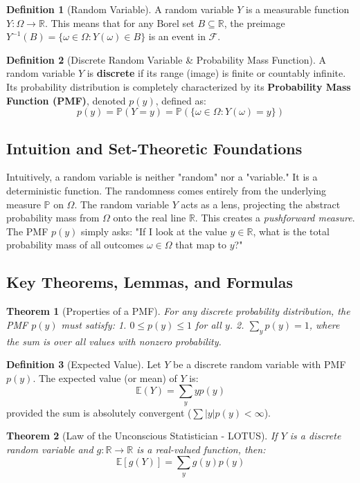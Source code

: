 \documentclass[11pt,letterpaper]{article}
\theoremstyle{definition}
\newtheorem{definition}{Definition}[section]
\theoremstyle{plain}
\newtheorem{theorem}{Theorem}[section]
\theoremstyle{remark}
\newcommand{\E}{\mathbb{E}}
\newcommand{\R}{\mathbb{R}}
\newcommand{\Prob}{\mathbb{P}}
\newcommand{\F}{\mathcal{F}}
\begin{document}
\begin{definition}[Random Variable]
A random variable $Y$ is a measurable function $Y: \Omega \to \R$. This means that for any Borel set $B \subseteq \R$, the preimage $Y^{-1}(B) = \{\omega \in \Omega : Y(\omega) \in B\}$ is an event in $\F$. 
\end{definition}

\begin{definition}[Discrete Random Variable \& Probability Mass Function]
A random variable $Y$ is \textbf{discrete} if its range (image) is finite or countably infinite. Its probability distribution is completely characterized by its \textbf{Probability Mass Function (PMF)}, denoted $p(y)$, defined as:
\[ p(y) = \Prob(Y = y) = \Prob(\{\omega \in \Omega : Y(\omega) = y\}) \]
\end{definition}

\subsection{Intuition and Set-Theoretic Foundations}
Intuitively, a random variable is neither "random" nor a "variable." It is a deterministic function. The randomness comes entirely from the underlying measure $\Prob$ on $\Omega$. The random variable $Y$ acts as a lens, projecting the abstract probability mass from $\Omega$ onto the real line $\R$. This creates a \textit{pushforward measure}. The PMF $p(y)$ simply asks: "If I look at the value $y \in \R$, what is the total probability mass of all outcomes $\omega \in \Omega$ that map to $y$?"

\subsection{Key Theorems, Lemmas, and Formulas}
\begin{theorem}[Properties of a PMF]
For any discrete probability distribution, the PMF $p(y)$ must satisfy:
1. $0 \le p(y) \le 1$ for all $y$.
2. $\sum_{y} p(y) = 1$, where the sum is over all values with nonzero probability.
\end{theorem}

\begin{definition}[Expected Value]
Let $Y$ be a discrete random variable with PMF $p(y)$. The expected value (or mean) of $Y$ is:
\[ \E(Y) = \sum_{y} y p(y) \]
provided the sum is absolutely convergent ($\sum |y|p(y) < \infty$).
\end{definition}

\begin{theorem}[Law of the Unconscious Statistician - LOTUS]
If $Y$ is a discrete random variable and $g: \R \to \R$ is a real-valued function, then:
\[ \E[g(Y)] = \sum_{y} g(y) p(y) \]
\end{theorem}
\end{document}
